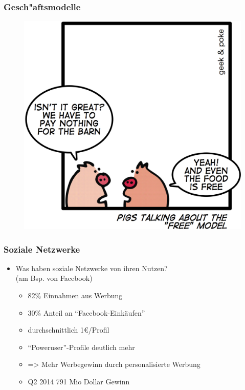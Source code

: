 \documentclass[12pt]{beamer}
\begin{document}
\begin{frame}
  \frametitle{Gesch"aftsmodelle}
  \begin{figure}
    \includegraphics[height=0.7\textheight]{img/business_pigs.jpg}
  \end{figure}
\end{frame}

\begin{frame}
  \frametitle{Soziale Netzwerke}

  \begin{itemize}
    \item Was haben soziale Netzwerke von ihren Nutzen?\\(am Bsp. von Facebook)
      \begin{itemize}
        \item<2-> 82\% Einnahmen aus Werbung
        \item<3-> 30\% Anteil an "`Facebook-Einkäufen"'
        \item<4-> durchschnittlich 1€/Profil
        \item<5-> "`Poweruser"'-Profile deutlich mehr
        \item<6-> => Mehr Werbegewinn durch personalisierte Werbung
	\item<7-> Q2 2014 791 Mio Dollar Gewinn
      \end{itemize}
  \end{itemize}
\end{frame}
\end{document}
